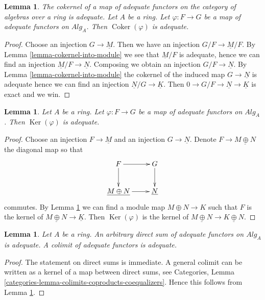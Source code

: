 \documentclass{stacks-project}
\newenvironment{slogan}{\comment}{\endcomment}
\theoremstyle{plain}
\newtheorem{lemma}[subsection]{Lemma}
\theoremstyle{definition}
\theoremstyle{remark}
\numberwithin{equation}{subsection}
\def\Ker{\mathop{\mathrm{Ker}}}
\def\Coker{\mathop{\mathrm{Coker}}}
\begin{document}
\begin{lemma}
\label{lemma-cokernel-adequate}
\begin{slogan}
The cokernel of a map of adequate functors on the category of algebras
over a ring is adequate.
\end{slogan}
Let $A$ be a ring.
Let $\varphi : F \to G$ be a map of adequate functors on $\textit{Alg}_A$.
Then $\Coker(\varphi)$ is adequate.
\end{lemma}

\begin{proof}
Choose an injection $G \to \underline{M}$.
Then we have an injection $G/F \to \underline{M}/F$. By
Lemma \ref{lemma-cokernel-into-module}
we see that $\underline{M}/F$ is adequate, hence we can find an injection
$\underline{M}/F \to \underline{N}$.
Composing we obtain an injection $G/F \to \underline{N}$. By
Lemma \ref{lemma-cokernel-into-module}
the cokernel of the induced map $G \to \underline{N}$ is adequate
hence we can find an injection $\underline{N}/G \to \underline{K}$.
Then $0 \to G/F \to \underline{N} \to \underline{K}$ is exact and
we win.
\end{proof}

\begin{lemma}
\label{lemma-kernel-adequate}
Let $A$ be a ring.
Let $\varphi : F \to G$ be a map of adequate functors on $\textit{Alg}_A$.
Then $\Ker(\varphi)$ is adequate.
\end{lemma}

\begin{proof}
Choose an injection $F \to \underline{M}$ and an injection
$G \to \underline{N}$. Denote $F \to \underline{M \oplus N}$
the diagonal map so that
$$
\xymatrix{
F \ar[d] \ar[r] & G \ar[d] \\
\underline{M \oplus N} \ar[r] & \underline{N}
}
$$
commutes. By
Lemma \ref{lemma-cokernel-adequate}
we can find a module map $M \oplus N \to K$ such that
$F$ is the kernel of $\underline{M \oplus N} \to \underline{K}$.
Then $\Ker(\varphi)$ is the kernel of
$\underline{M \oplus N} \to \underline{K \oplus N}$.
\end{proof}

\begin{lemma}
\label{lemma-colimit-adequate}
Let $A$ be a ring.
An arbitrary direct sum of adequate functors on $\textit{Alg}_A$
is adequate. A colimit of adequate functors is adequate.
\end{lemma}

\begin{proof}
The statement on direct sums is immediate.
A general colimit can be written as a kernel of a map between
direct sums, see
Categories, Lemma \ref{categories-lemma-colimits-coproducts-coequalizers}.
Hence this follows from
Lemma \ref{lemma-kernel-adequate}.
\end{proof}
\end{document}
